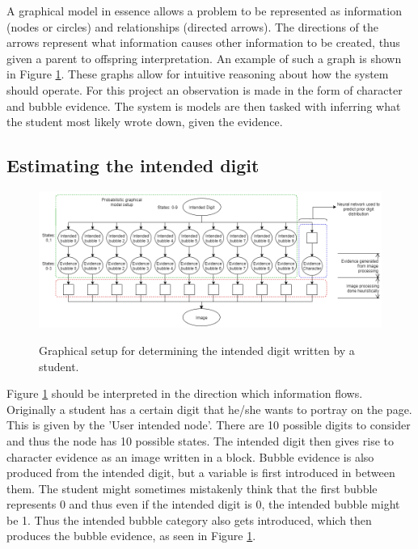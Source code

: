 A graphical model in essence allows a problem to be represented as information (nodes or circles) and relationships (directed arrows). The directions of the arrows represent what information causes other information to be created, thus given a parent to offspring interpretation. An example of such a graph is shown in Figure \ref{fig:pgmDigit}. These graphs allow for intuitive reasoning about how the system should operate. For this project an observation is made in the form of character and bubble evidence. The system is models are then tasked with inferring what the student most likely wrote down, given the evidence.

\subsection{Estimating the intended digit}
\label{sec:studentDigit}

\begin{figure}
  \centering
  \includegraphics[width=16cm]{pgmDigit}\\
  \caption{Graphical setup for determining the intended digit written by a student.}
  \label{fig:pgmDigit}
\end{figure}

Figure \ref{fig:pgmDigit} should be interpreted in the direction which information flows. Originally a student has a certain digit that he/she wants to portray on the page. This is given by the 'User intended node'. There are 10 possible digits to consider and thus the node has 10 possible states. The intended digit then gives rise to character evidence as an image written in a block. Bubble evidence is also produced from the intended digit, but a variable is first introduced in between them. The student might sometimes mistakenly think that the first bubble represents 0 and thus even if the intended digit is 0, the intended bubble might be 1. Thus the intended bubble category also gets introduced, which then produces the bubble evidence, as seen in Figure \ref{fig:pgmDigit}.  

